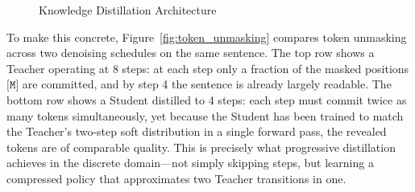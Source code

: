 \documentclass[11pt, a4paper]{article}
\begin{document}
\begin{figure}[H]
{%
}
\caption{Knowledge Distillation Architecture}
\end{figure}

\noindent To make this concrete, Figure~\ref{fig:token_unmasking} compares token unmasking across two denoising schedules on the same sentence. The top row shows a Teacher operating at 8 steps: at each step only a fraction of the masked positions $\texttt{[M]}$ are committed, and by step 4 the sentence is already largely readable. The bottom row shows a Student distilled to 4 steps: each step must commit twice as many tokens simultaneously, yet because the Student has been trained to match the Teacher's two-step soft distribution in a single forward pass, the revealed tokens are of comparable quality. This is precisely what progressive distillation achieves in the discrete domain---not simply skipping steps, but learning a compressed policy that approximates two Teacher transitions in one.
\end{document}

